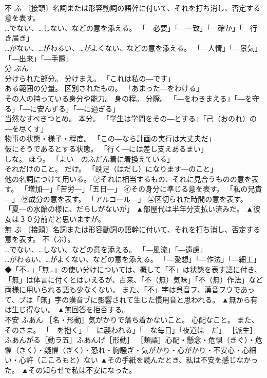 \documentclass[8pt]{extreport}
\begin{document}
\begin{CJK}{UTF8}{min}
\\	不	ふ	〔接頭〕名詞または形容動詞の語幹に付いて、それを打ち消し、否定する意を表す。 
\\	…でない、…しない、などの意を添える。 「―必要」「―一致」「―確か」「―行き届き」 
\\	…がない、…がわるい、…がよくない、などの意を添える。 「―人情」「―景気」「―出来」「―手際」	
\\	分	ぶん	
\\	分けられた部分。 分けまえ。 「これは私の―です」 
\\	ある範囲の分量。 区別されたもの。 「あまった―をわける」 
\\	その人の持っている身分や能力。 身の程。 分際。 「―をわきまえる」「―を守る」「―に安んずる」「―に過ぎる」 
\\	当然なすべきつとめ。 本分。 「学生は学問をその―とする」「己（おのれ）の―を尽くす」 
\\	物事の状態・様子・程度。 「この―なら計画の実行は大丈夫だ」 
\\	仮にそうであるとする状態。 「行く―には差し支えあるまい」 
\\	しな。 ほう。 「よい―のふだん着に着換えている」 
\\	それだけのこと。 だけ。 「跣足（はだし）になります―のこと」 
\\	他の名詞につけて用いる。 ㋐それに相当するもの、それに見合うものの意を表す。 「増加―」「苦労―」「五日―」 ㋑その身分に準じる意を表す。 「私の兄貴―」 ㋒成分の意を表す。 「アルコール―」 ㋓区切られた時間の意を表す。 「夏―の水飴の様に、だらしがないが」	▲部屋代は半年分支払い済みだ。 ▲彼女は３０分前だと思いますが。
\\	無	ぶ	〔接頭〕名詞または形容動詞の語幹に付いて、それを打ち消し、否定する意を表す。 不（ぶ）。 
\\	…でない、…しない、などの意を添える。 「―風流」「―遠慮」 
\\	…がわるい、…がよくない、などの意を添える。 「―愛想」「―作法」「―細工」 ◆「不…」「無…」の使い分けについては、概して「不」は状態を表す語に付き、「無」は体言に付くとはいえるが、古来、「不（無）気味」「不（無）作法」など両様に用いられる語も少なくない。 また、「不」字は呉音フ、漢音フウであって、ブは「無」字の漢音ブに影響されて生じた慣用音と思われる。	▲無から有は生じ得ない。 ▲無回答を拒否する。
\\	不安	ふあん	［名・形動］気がかりで落ち着かないこと。 心配なこと。 また、そのさま。 「―を抱く」「―に襲われる」「―な毎日」「夜道は―だ」 ［派生］ふあんがる［動ラ五］ふあんげ［形動］ ［類語］心配・懸念・危惧（きぐ）・危懼（きく）・疑懼（ぎく）・恐れ・胸騒ぎ・気がかり・心がかり・不安心・心細い・心許（こころもと）ない	▲その手紙を読んだとき、私は不安を感じなかった。 ▲その知らせで私は不安になった。

\end{CJK}
\end{document}
